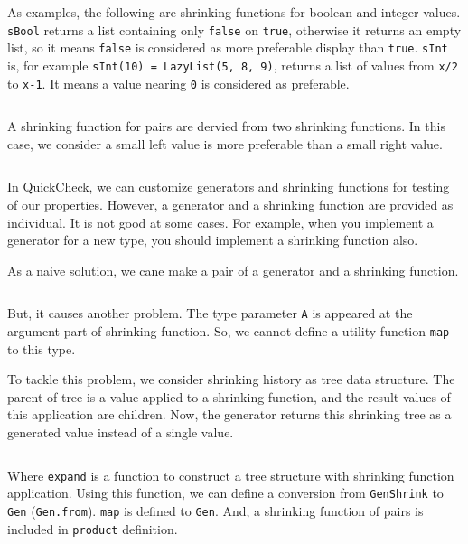 \documentclass[a4paper,10pt]{article}
\theoremstyle{definition}
\begin{document}
As examples, the following are shrinking functions for boolean and integer values.
\texttt{sBool} returns a list containing only \texttt{false} on \texttt{true}, otherwise it returns an empty list, so it means \texttt{false} is considered as more preferable display than \texttt{true}.
\texttt{sInt} is, for example \texttt{sInt(10) = LazyList(5, 8, 9)}, returns a list of values from \texttt{x/2} to \texttt{x-1}.
It means a value nearing \texttt{0} is considered as preferable.

\inputminted[breaklines,firstline=40,lastline=43]{scala}{../src/main/scala/minicheck.scala}

A shrinking function for pairs are dervied from two shrinking functions.
In this case, we consider a small left value is more preferable than a small right value.

\inputminted[breaklines,firstline=45,lastline=47]{scala}{../src/main/scala/minicheck.scala}

In QuickCheck, we can customize generators and shrinking functions for testing of our properties.
However, a generator and a shrinking function are provided as individual.
It is not good at some cases.
For example, when you implement a generator for a new type, you should implement a shrinking function also.

As a naive solution, we cane make a pair of a generator and a shrinking function.

\inputminted[breaklines,firstline=49,lastline=49]{scala}{../src/main/scala/minicheck.scala}

But, it causes another problem.
The type parameter \texttt{A} is appeared at the argument part of shrinking function.
So, we cannot define a utility function \texttt{map} to this type.

To tackle this problem, we consider shrinking history as tree data structure.
The parent of tree is a value applied to a shrinking function, and the result values of this application are children.
Now, the generator returns this shrinking tree as a generated value instead of a single value.

\inputminted[breaklines,firstline=51,lastline=66]{scala}{../src/main/scala/minicheck.scala}

Where \texttt{expand} is a function to construct a tree structure with shrinking function application.
Using this function, we can define a conversion from \texttt{GenShrink} to \texttt{Gen} (\texttt{Gen.from}).
\texttt{map} is defined to \texttt{Gen}.
And, a shrinking function of pairs is included in \texttt{product} definition.
\end{document}
